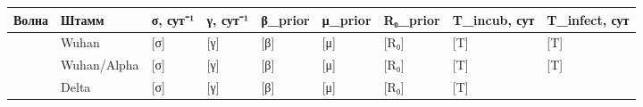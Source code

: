 \documentclass[12pt]{article}
\begin{document}
{\def\LTcaptype{none} %
\begin{longtable}[]{@{}
  >{\centering\arraybackslash}p{}
  >{\raggedright\arraybackslash}p{}
  >{\centering\arraybackslash}p{}
  >{\centering\arraybackslash}p{}
  >{\centering\arraybackslash}p{}
  >{\centering\arraybackslash}p{}
  >{\centering\arraybackslash}p{}
  >{\centering\arraybackslash}p{}
  >{\centering\arraybackslash}p{}@{}}
\toprule\noalign{}
\begin{minipage}[b]{\linewidth}\centering
Волна
\end{minipage} & \begin{minipage}[b]{\linewidth}\raggedright
Штамм
\end{minipage} & \begin{minipage}[b]{\linewidth}\centering
σ, сут⁻¹
\end{minipage} & \begin{minipage}[b]{\linewidth}\centering
γ, сут⁻¹
\end{minipage} & \begin{minipage}[b]{\linewidth}\centering
β\_prior
\end{minipage} & \begin{minipage}[b]{\linewidth}\centering
μ\_prior
\end{minipage} & \begin{minipage}[b]{\linewidth}\centering
R₀\_prior
\end{minipage} & \begin{minipage}[b]{\linewidth}\centering
T\_incub, сут
\end{minipage} & \begin{minipage}[b]{\linewidth}\centering
T\_infect, сут
\end{minipage} \\
\midrule\noalign{}
\endhead
\bottomrule\noalign{}
\endlastfoot
1 & Wuhan & {[}σ{]} & {[}γ{]} & {[}β{]} & {[}μ{]} & {[}R₀{]} & {[}T{]} &
{[}T{]} \\
2 & Wuhan/Alpha & {[}σ{]} & {[}γ{]} & {[}β{]} & {[}μ{]} & {[}R₀{]} &
{[}T{]} & {[}T{]} \\
3 & Delta & {[}σ{]} & {[}γ{]} & {[}β{]} & {[}μ{]} & {[}R₀{]} & {[}T{]} &

\end{longtable}}
\end{document}
